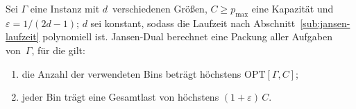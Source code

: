 \begin{lemma}[Jansen-Dual ist $\varepsilon$-dual für $\varepsilon = 1/(2d-1)$]
\label{lem:jansen-dual}
  Sei $\Gamma$ eine Instanz mit $d$~verschiedenen Größen, $C \ge p_{\max}$ eine Kapazität
  und $\varepsilon = 1/(2d-1)$; $d$ sei konstant, sodass die Laufzeit nach
  Abschnitt~\ref{sub:jansen-laufzeit} polynomiell ist.
  Jansen-Dual berechnet eine Packung aller Aufgaben von~$\Gamma$, für die gilt:
  \begin{enumerate}[label=(\roman*)]
    \item die Anzahl der verwendeten Bins beträgt höchstens $\mathrm{OPT}[\Gamma, C]$;
    \item jeder Bin trägt eine Gesamtlast von höchstens $(1+\varepsilon)\, C$.
  \end{enumerate}
\end{lemma}

